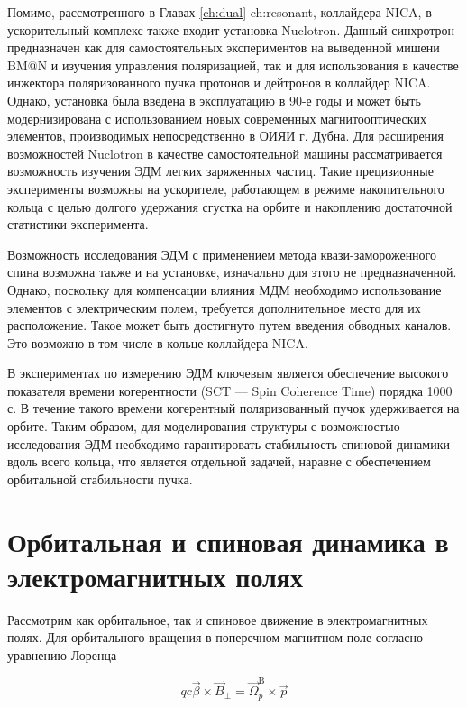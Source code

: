 \par Помимо, рассмотренного в Главах \ref{ch:dual}-{ch:resonant}, коллайдера NICA, в ускорительный комплекс также входит установка Nuclotron. Данный синхротрон предназначен как для самостоятельных экспериментов на выведенной мишени BM@N и изучения управления поляризацией, так и для использования в качестве инжектора поляризованного пучка протонов и дейтронов в коллайдер NICA. Однако, установка была введена в эксплуатацию в 90-е годы и может быть модернизирована с использованием новых современных магнитооптических элементов, производимых непосредственно в ОИЯИ г. Дубна. Для расширения возможностей Nuclotron в качестве самостоятельной машины рассматривается возможность изучения ЭДМ легких заряженных частиц. Такие прецизионные эксперименты возможны на ускорителе, работающем в режиме накопительного кольца с целью долгого удержания сгустка на орбите и накоплению достаточной статистики эксперимента. 

\par Возможность исследования ЭДМ с применением метода квази-замороженного спина возможна также и на установке, изначально для этого не предназначенной. Однако, поскольку для компенсации влияния МДМ необходимо использование элементов с электрическим полем, требуется дополнительное место для их расположение. Такое может быть достигнуто путем введения обводных каналов. Это возможно в том числе в кольце коллайдера NICA.

\par В экспериментах по измерению ЭДМ ключевым является обеспечение высокого показателя времени когерентности (SCT — Spin Coherence Time) порядка 1000 с. В течение такого времени когерентный поляризованный пучок удерживается на орбите. Таким образом, для моделирования структуры с возможностью исследования ЭДМ необходимо гарантировать стабильность спиновой динамики вдоль всего кольца, что является отдельной задачей, наравне с обеспечением орбитальной стабильности пучка. 

\section{Орбитальная и спиновая динамика в электромагнитных полях}\label{sec:EDM/requirements/deflector}

\par Рассмотрим как орбитальное, так и спиновое движение в электромагнитных полях. Для орбитального вращения в поперечном магнитном поле согласно уравнению Лоренца

\begin{equation}
qc\vec{\beta}\times{\vec{B}}_\bot={\vec{\Omega}}_p^{\textrm{B}}\times\vec{p}
\end{equation}

